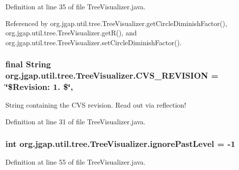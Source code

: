 Definition at line 35 of file Tree\-Visualizer.\-java.



Referenced by org.\-jgap.\-util.\-tree.\-Tree\-Visualizer.\-get\-Circle\-Diminish\-Factor(), org.\-jgap.\-util.\-tree.\-Tree\-Visualizer.\-get\-R(), and org.\-jgap.\-util.\-tree.\-Tree\-Visualizer.\-set\-Circle\-Diminish\-Factor().

\hypertarget{classorg_1_1jgap_1_1util_1_1tree_1_1_tree_visualizer_ada462534d060005a1144e68844921b5b}{
\subsubsection[{C\-V\-S\-\_\-\-R\-E\-V\-I\-S\-I\-O\-N}]{\setlength{\rightskip}{0pt plus 5cm}final String org.\-jgap.\-util.\-tree.\-Tree\-Visualizer.\-C\-V\-S\-\_\-\-R\-E\-V\-I\-S\-I\-O\-N = \char`\"{}\$Revision\-: 1. \$\char`\"{}\hspace{0.3cm}{\ttfamily [static]}, {\ttfamily [private]}}}\label{classorg_1_1jgap_1_1util_1_1tree_1_1_tree_visualizer_ada462534d060005a1144e68844921b5b}
String containing the C\-V\-S revision. Read out via reflection! 

Definition at line 31 of file Tree\-Visualizer.\-java.

\hypertarget{classorg_1_1jgap_1_1util_1_1tree_1_1_tree_visualizer_a3bc565082bafb781ffd45e32def3c1ac}{
\subsubsection[{ignore\-Past\-Level}]{\setlength{\rightskip}{0pt plus 5cm}int org.\-jgap.\-util.\-tree.\-Tree\-Visualizer.\-ignore\-Past\-Level = -\/1\hspace{0.3cm}{\ttfamily [private]}}}\label{classorg_1_1jgap_1_1util_1_1tree_1_1_tree_visualizer_a3bc565082bafb781ffd45e32def3c1ac}


Definition at line 55 of file Tree\-Visualizer.\-java.



